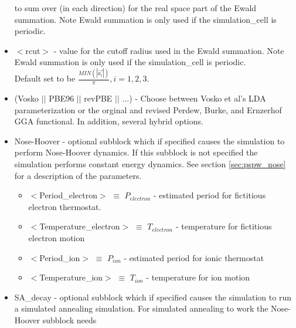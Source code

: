 \begin{itemize}
                          to sum over (in each direction) for the real space
                          part of the Ewald summation. Note Ewald summation
                          is only used if the simulation\_cell is periodic.
        \item $<$rcut$>$ - value for the cutoff radius used
                          in the Ewald summation.  Note Ewald summation
                          is only used if the simulation\_cell is periodic. \\
                          Default set to be
                          $\frac{MIN(\left| \vec{a_i} \right|)}{\pi}, i=1,2,3$.
        \item (Vosko $||$ PBE96 $||$ revPBE $||$ ...) - Choose between Vosko et al's LDA 
                               parameterization or the orginal and revised Perdew, Burke, 
                               and Ernzerhof GGA functional.  In addition, several hybrid options.
        \item Nose-Hoover - optional subblock which if specified
                         causes the simulation to perform Nose-Hoover dynamics.
                         If this subblock is not specified the 
                         simulation performs constant energy dynamics.
                         See section \ref{sec:pspw_nose} for a description of the parameters.
                         \begin{itemize}
                             \item $<$Period\_electron$>$ $\equiv$ $P_{electron}$ 
                                    - estimated period for fictitious electron thermostat.
                             \item $<$Temperature\_electron$>$ $\equiv$ $T_{electron}$ 
                                    - temperature for fictitious electron motion
                             \item $<$Period\_ion$>$ $\equiv$ $P_{ion}$ 
                                    - estimated period for ionic thermostat
                             \item $<$Temperature\_ion$>$ $\equiv$ $T_{ion}$ 
                                    - temperature for ion motion
                         \end{itemize}
        \item SA\_decay - optional subblock which if specified
                         causes the simulation to run a simulated annealing simulation.
                         For simulated annealing to work the Nose-Hoover subblock needs 

\end{itemize}

